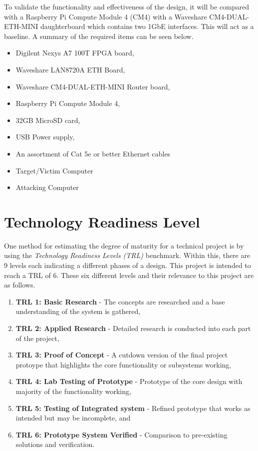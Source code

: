 To validate the functionality and effectiveness of the design, it will be compared with a Raspberry Pi Compute Module 4 (CM4) with a Waveshare CM4-DUAL-ETH-MINI 
daughterboard which contains two 1GbE interfaces. This will act as a baseline. A summary of the required items can be seen below.

\begin{itemize}
    \item Digilent Nexys A7 100T FPGA board,
    \item Waveshare LAN8720A ETH Board,
    \item Waveshare CM4-DUAL-ETH-MINI Router board,
    \item Raspberry Pi Compute Module 4,
    \item 32GB MicroSD card,
    \item USB Power supply,
    \item An assortment of Cat 5e or better Ethernet cables
    \item Target/Victim Computer
    \item Attacking Computer
\end{itemize}


\section{Technology Readiness Level}

One method for estimating the degree of maturity for a technical project is by using the \textit{Technology Readiness Levels (TRL)} benchmark. Within this, 
there are 9 levels each indicating a different phases of a design. This project is intended to reach a TRL of 6. These six different levels and their 
relevance to this project are as follows. 

\begin{enumerate}
    \item \textbf{TRL 1: Basic Research} - The concepts are researched and a base understanding of the system is gathered,
    \item \textbf{TRL 2: Applied Research} - Detailed research is conducted into each part of the project,
    \item \textbf{TRL 3: Proof of Concept} - A cutdown version of the final project protoype that highlights the core functionality or subsystems working,
    \item \textbf{TRL 4: Lab Testing of Prototype} - Prototype of the core design with majority of the functionality working,
    \item \textbf{TRL 5: Testing of Integrated system} - Refined prototype that works as intended but may be incomplete, and
    \item \textbf{TRL 6: Prototype System Verified} - Comparison to pre-existing solutions and verification. 
\end{enumerate}


